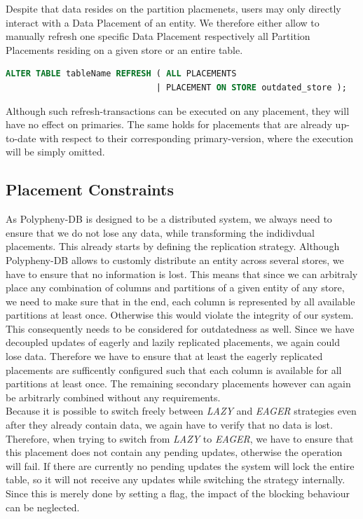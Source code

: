 Despite that data resides on the partition placmenets, users may only directly interact with a Data Placement of an entity.
We therefore either allow to manually refresh one specific Data Placement respectively all Partition Placements residing on a given store or an entire table.

\begin{lstlisting}[language=sql, caption={SQL Statement Syntax for an On-Demand Refresh Operation},label={lst:refresh}]
ALTER TABLE tableName REFRESH ( ALL PLACEMENTS 
                              | PLACEMENT ON STORE outdated_store );
\end{lstlisting}

Although such refresh-transactions can be executed on any placement, they will have no effect on primaries. 
The same holds for placements that are already up-to-date with respect to their corresponding primary-version, where the execution will be simply omitted.





\subsection{Placement Constraints}
\label{sec:constraints}

As Polypheny-DB is designed to be a distributed system, we always need to ensure that we do not lose any data, while transforming the indidivdual placements. 
This already starts by defining the replication strategy. Although Polypheny-DB allows to customly distribute an entity across several stores, we have to ensure that no 
information is lost. This means that since we can arbitraly place any combination of columns and partitions of a given entity of any store, we need to make sure that in the end, 
each column is represented by all available partitions at least once. Otherwise this would violate the integrity of our system. 
This consequently needs to be considered for outdatedness as well. Since we have decoupled updates of eagerly and lazily replicated placements, we again could lose data. 
Therefore we have to ensure that at least the eagerly replicated placements are sufficently configured such that each column is available for all partitions at least once.
The remaining secondary placements however can again be arbitrarly combined without any requirements.\\
Because it is possible to switch freely between \emph{LAZY} and \emph{EAGER} strategies even after they already contain data, we again have to verify that no data is lost.
Therefore, when trying to switch from \emph{LAZY} to \emph{EAGER}, we have to ensure that this placement does not contain any pending updates, otherwise the operation will fail.
If there are currently no pending updates the system will lock the entire table, so it will not receive any updates while switching the strategy internally. 
Since this is merely done by setting a flag, the impact of the blocking behaviour can be neglected.

